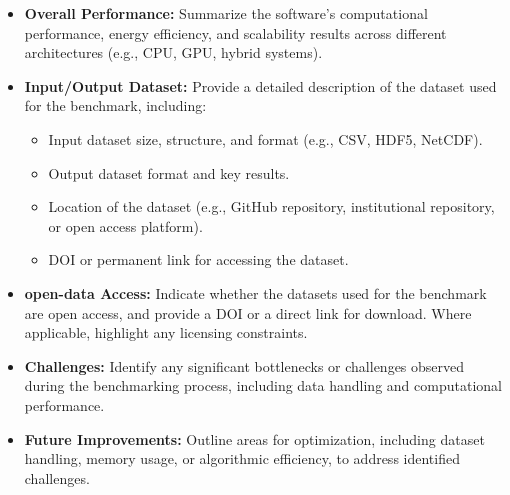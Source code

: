 \begin{itemize}
    \item \textbf{Overall Performance:} Summarize the software's computational performance, energy efficiency, and scalability results across different architectures (e.g., CPU, GPU, hybrid systems).
    \item \textbf{Input/Output Dataset:} Provide a detailed description of the dataset used for the benchmark, including:
        \begin{itemize}
            \item Input dataset size, structure, and format (e.g., CSV, HDF5, NetCDF).
            \item Output dataset format and key results.
            \item Location of the dataset (e.g., GitHub repository, institutional repository, or open access platform).
            \item DOI or permanent link for accessing the dataset.
        \end{itemize}
    \item \textbf{open-data Access:} Indicate whether the datasets used for the benchmark are open access, and provide a DOI or a direct link for download. Where applicable, highlight any licensing constraints.
    \item \textbf{Challenges:} Identify any significant bottlenecks or challenges observed during the benchmarking process, including data handling and computational performance.
    \item \textbf{Future Improvements:} Outline areas for optimization, including dataset handling, memory usage, or algorithmic efficiency, to address identified challenges.
\end{itemize}




